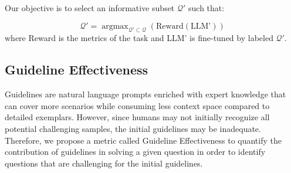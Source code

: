 Our objective is to select an informative subset $\mathcal{Q}'$ such that:

\begin{equation}
    \mathcal{Q}' = \mathop{\arg\max}_{\mathcal{Q}' \subset \mathcal{Q}} (\text{Reward}(\text{LLM'}))
\end{equation}
where Reward is the metrics of the task and LLM' is fine-tuned by labeled $\mathcal{Q}'$.


\subsection{Guideline Effectiveness}

Guidelines are natural language prompts enriched with expert knowledge that can cover more scenarios while consuming less context space compared to detailed exemplars. %
However, since humans may not initially recognize all potential challenging samples, the initial guidelines may be inadequate.
Therefore, we propose a metric called Guideline Effectiveness to quantify the contribution of guidelines in solving a given question in order to identify questions that are challenging for the initial guidelines.

